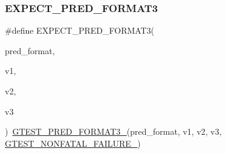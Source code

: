 \mbox{\label{_obj__test_2lib_2googletest-release-1_88_81_2googletest_2include_2gtest_2gtest__pred__impl_8h_a7285708fa5d37d6d8ed5b5e59da08bae}} 
\subsubsection{\texorpdfstring{EXPECT\_PRED\_FORMAT3}{EXPECT\_PRED\_FORMAT3}}
{\footnotesize\ttfamily \#define E\+X\+P\+E\+C\+T\+\_\+\+P\+R\+E\+D\+\_\+\+F\+O\+R\+M\+A\+T3(\begin{DoxyParamCaption}\item[{}]{pred\+\_\+format,  }\item[{}]{v1,  }\item[{}]{v2,  }\item[{}]{v3 }\end{DoxyParamCaption})~\mbox{\hyperlink{_obj__test_2lib_2googletest-release-1_88_81_2googletest_2include_2gtest_2gtest__pred__impl_8h_a49cdf8707268ee932bb772d879a226cc}{G\+T\+E\+S\+T\+\_\+\+P\+R\+E\+D\+\_\+\+F\+O\+R\+M\+A\+T3\+\_\+}}(pred\+\_\+format, v1, v2, v3, \mbox{\hyperlink{_obj__test_2lib_2googletest-release-1_88_81_2googletest_2include_2gtest_2internal_2gtest-internal_8h_a6cb7482cfa03661a91c698eb5895f642}{G\+T\+E\+S\+T\+\_\+\+N\+O\+N\+F\+A\+T\+A\+L\+\_\+\+F\+A\+I\+L\+U\+R\+E\+\_\+}})}

\mbox{\label{_obj__test_2lib_2googletest-release-1_88_81_2googletest_2include_2gtest_2gtest__pred__impl_8h_a3354347de0f2445400b509cf39dce1dc}} 
